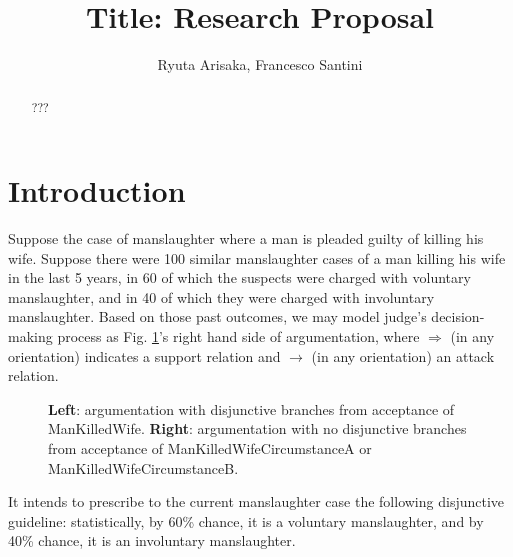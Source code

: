 \documentclass{llncs}%
\begin{document}
\title{Title: Research Proposal}

\author{Ryuta Arisaka, Francesco Santini}

\maketitle
 




\begin{abstract}
???
\end{abstract}



\section{Introduction}\label{sec:intro}
Suppose the case of manslaughter where a man is pleaded guilty of killing his wife. Suppose there were 
100 similar manslaughter cases of a man killing his wife in the last 5 years, in 60 of which the suspects were charged with voluntary manslaughter, 
and in 40 of which they were charged with involuntary manslaughter. Based on those past outcomes, we may model 
judge's decision-making process as Fig. \ref{fig_stat}'s right hand side of argumentation, where $\Rightarrow$ (in any orientation) indicates a support relation  
and $\rightarrow$ (in any orientation) an attack relation. 
\begin{figure}[!h]  
	\caption{\textbf{Left}: argumentation with disjunctive branches from acceptance of ManKilledWife. \textbf{Right}: argumentation 
	with no disjunctive branches from acceptance of ManKilledWifeCircumstanceA or ManKilledWifeCircumstanceB.} 
	\label{fig_stat} 
\end{figure} 
It intends to prescribe to the current manslaughter case the following disjunctive guideline: statistically, by 60\% chance, 
it is a voluntary manslaughter, and by 40\% chance, it is an involuntary manslaughter. 
\end{document}
